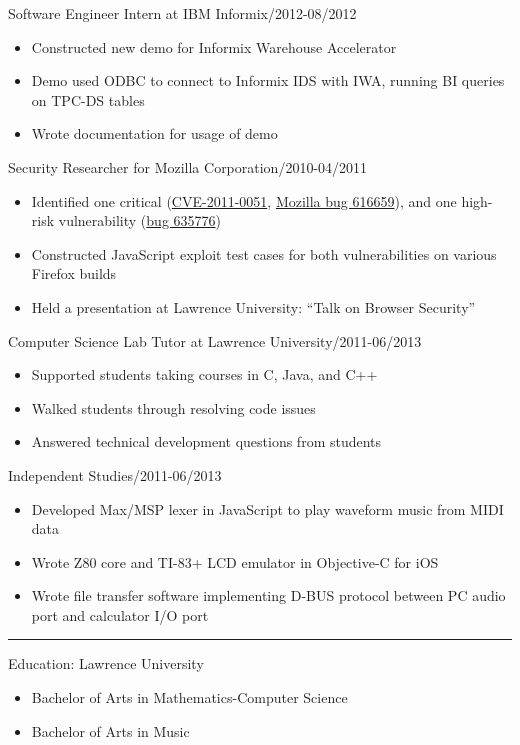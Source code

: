 \documentclass[letterpaper, 11pt]{article}
\newcommand{\superbold}[1]{{\fontseries{b}\selectfont#1}}
\newcommand{\dottitle}[2]{\flushleft\normalsize\superbold{#1\dotfill#2}}
\newcommand{\jobStart}[2]{
    \dottitle{#1}{#2}\vspace{-0.05cm}
    \begin{itemize}
}
\newcommand{\jobEnd}{
    \end{itemize}\vspace{0.05cm}
}
\begin{document}
\jobStart{Software Engineer Intern at IBM Informix}{06/2012-08/2012}
    \item Constructed new demo for Informix Warehouse Accelerator
    \item Demo used ODBC to connect to Informix IDS with IWA, running BI queries on TPC-DS tables
    \item Wrote documentation for usage of demo
\jobEnd

\jobStart{Security Researcher for Mozilla Corporation}{09/2010-04/2011}
    \item Identified one critical (\href{https://cve.mitre.org/cgi-bin/cvename.cgi?name=CVE-2011-0051}{CVE-2011-0051}, \href{https://www.mozilla.org/en-US/security/advisories/mfsa2011-02}{Mozilla bug 616659}), and one high-risk vulnerability (\href{https://bugzilla.mozilla.org/show_bug.cgi?id=635776}{bug 635776})
    \item Constructed JavaScript exploit test cases for both vulnerabilities on various Firefox builds
    \item Held a presentation at Lawrence University: “Talk on Browser Security”
\jobEnd

\jobStart{Computer Science Lab Tutor at Lawrence University}{09/2011-06/2013}
    \item Supported students taking courses in C, Java, and C++
    \item Walked students through resolving code issues
    \item Answered technical development questions from students
\jobEnd

\jobStart{Independent Studies}{09/2011-06/2013}
    \item Developed Max/MSP lexer in JavaScript to play waveform music from MIDI data
    \item Wrote Z80 core and TI-83+ LCD emulator in Objective-C for iOS
    \item Wrote file transfer software implementing D-BUS protocol between PC audio port and calculator I/O port
\jobEnd

\hrule\vspace{0.3cm}

{
    \dottitle{Education: Lawrence University}{2013}\vspace{-0.05cm}
    \begin{itemize}[label={}]
        \item Bachelor of Arts in Mathematics-Computer Science
        \item Bachelor of Arts in Music
    \end{itemize}
}
\end{document}
